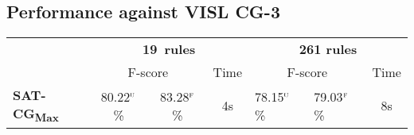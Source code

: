 


\def\satcgMax{SAT-CG\textsubscript{Max}}
\def\satcgOrd{SAT-CG\textsubscript{Ord}}

\subsection{Performance against VISL CG-3}


\begin{table}[h]
\centering
\begin{tabular}{l | c c c | p{1.3cm} p{1.3cm}  c}
 
\multicolumn{1}{r|}{} & \multicolumn{3}{c|}{\textbf{19~rules}} &  \multicolumn{3}{c}{\textbf{261 rules}} \\
                          & \multicolumn{2}{c}{F-score} 
                                               & Time   & \multicolumn{2}{c}{F-score} & Time \\ \hline

      \textbf{\satcgMax}  & 80.22$^{\textsc{u}}$ \%  & 83.28$^{\textsc{f}}$ \%
                          & 4s
                          & 78.15$^{\textsc{u}}$ \%  & 79.03$^{\textsc{f}}$ \% 
                          & 8s \\ 


\end{tabular}
\end{table}
